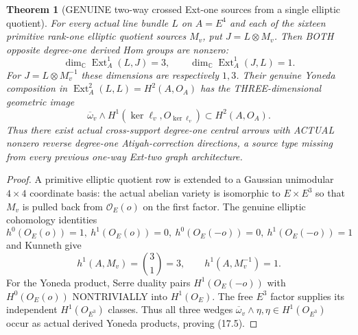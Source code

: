 \documentclass[11pt,a4paper]{article}
\newtheorem{theorem}{Theorem}[section]
\begin{document}
\begin{theorem}[GENUINE two-way crossed Ext-one sources from a single elliptic quotient]
For every
actual
line bundle
\(L\) on
\(A=E^4\)
and
each of the
sixteen
primitive
rank-one
elliptic
quotient
sources \(M_v\),
put \(J=L\otimes M_v\).
Then BOTH
opposite
degree-one
derived
Hom groups
are nonzero:
\[
 \boxed{
 \dim_{\mathbb C}
   \operatorname{Ext}^1_A(L,J)=3,
 \qquad
 \dim_{\mathbb C}
   \operatorname{Ext}^1_A(J,L)=1.
 }                                                       \tag{17.4}
\]
For \(J=L\otimes M_v^{-1}\)
these dimensions
are respectively
\(1,3\).
Their
genuine
Yoneda
composition
in
\(\operatorname{Ext}^2_A(L,L)
=H^2(A,O_A)\)
has the
THREE-dimensional
geometric
image
\[
 \boxed{
 \overline{\omega}_v
   \wedge
   H^1(\ker\ell_v,O_{\ker\ell_v})
                   \subset H^2(A,O_A).
 }                                                       \tag{17.5}
\]
Thus there
exist actual
cross-support
degree-one
central arrows
with ACTUAL
nonzero
reverse
degree-one
Atiyah-correction
directions,
a source
type missing
from every
previous
one-way
Ext-two graph
architecture.
\end{theorem}
\begin{proof}
A primitive
elliptic
quotient row
is extended
to a Gaussian
unimodular
\(4\times4\)
coordinate
basis:
the actual
abelian
variety is
isomorphic to
\(E\times E^3\)
so that
\(M_v\)
is pulled back
from
\(\mathcal O_E(o)\)
on the first
factor.
The genuine
elliptic
cohomology
identities
\[
 h^0(O_E(o))=1,\
 h^1(O_E(o))=0,\
 h^0(O_E(-o))=0,\
 h^1(O_E(-o))=1
\]
and Kunneth
give
\[
 h^1(A,M_v)=
     \binom31=3,
 \qquad
 h^1(A,M_v^{-1})=1.
\]
For the
Yoneda product,
Serre duality
pairs
\(H^1(O_E(-o))\)
with
\(H^0(O_E(o))\)
NONTRIVIALLY
into
\(H^1(O_E)\).
The free
\(E^3\)
factor supplies
its independent
\(H^1(O_{E^3})\)
classes.
Thus all
three wedges
\(
 \overline\omega_v
   \wedge\eta,
 \eta\in H^1(O_{E^3})
\)
occur as
actual
derived
Yoneda products,
proving
(17.5).
\end{proof}
\end{document}
